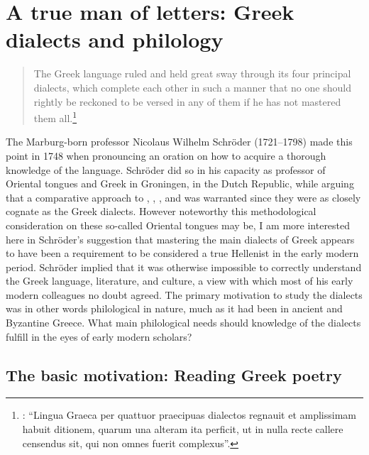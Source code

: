 \chapter{A true man of letters: Greek dialects and philology}

\label{chap:3}
\begin{quote}
The Greek language ruled and held great sway through its four principal dialects, which complete each other in such a manner that no one should rightly be reckoned to be versed in any of them if he has not mastered them all.\footnote{\citet[53--54]{Schroeder1748}: “Lingua Graeca per quattuor praecipuas dialectos regnauit et amplissimam habuit ditionem, quarum una alteram ita perficit, ut in nulla recte callere censendus sit, qui non omnes fuerit complexus”.}
\end{quote}

The Marburg-born professor Nicolaus Wilhelm Schröder (1721–1798) made this point in 1748 when pronouncing an oration on how to acquire a thorough knowledge of the  language. Schröder did so in his capacity as professor of Oriental tongues and Greek in Groningen, in the Dutch Republic, while arguing that a comparative approach to , , , and  was warranted since they were as closely cognate as the Greek dialects. However noteworthy this methodological consideration on these so-called Oriental tongues may be, I am more interested here in Schröder’s suggestion that mastering the main dialects of Greek appears to have been a requirement to be considered a true Hellenist in the early modern period. Schröder implied that it was otherwise impossible to correctly understand the Greek language, literature, and culture, a view with which most of his early modern colleagues no doubt agreed. The primary motivation to study the dialects was in other words philological in nature, much as it had been in ancient and Byzantine Greece. What main philological needs should knowledge of the dialects fulfill in the eyes of early modern scholars?

\section{The basic motivation: Reading Greek poetry}\label{sec:3.1}

